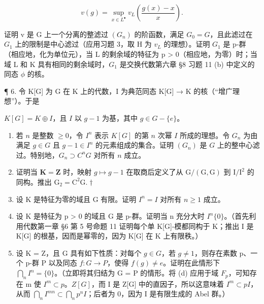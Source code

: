 \[
v (g) = \sup _ {x \in L ^ {\bullet}} v _ {L} \left(\frac {g (x) - x}{x}\right).
\]

证明 v 是 G 上一个分离的整滤过 \((G_{n})\) 的阶函数，满足 \(G_{0} = G\)，且此滤过在 \(G_{1}\) 上的限制是中心滤过（应用习题 3，取 H 为 \(v_{L}\) 的理想）。证明 \(G_{1}\) 是 p-群（相应地，化为单位元），当 L 的剩余域的特征为 p \textgreater{} 0（相应地，为零）时；当域 L 和 K 具有相同的剩余域时，\(G_{1}\) 是交换代数第六章 §8 习题 11 (b) 中定义的同态 \(\phi\) 的核。

¶ 6. 令 K{[}G{]} 为 G 在 K 上的代数，I 为典范同态 K{[}G{]} → K 的核（“增广理想”）。于是


\(K[G] = K \oplus I\)，且 \(I\) 以 \(g - 1\) 为基，其中 \(g \in G - \{e\}\)。

\begin{enumerate}
\def\labelenumi{(\alph{enumi})}
\item
  若 \(n\) 是整数 \(\geqslant 0\)，令 \(I^n\) 表示 \(K[G]\) 的第 \(n\) 次幂 \(I\) 所成的理想。令 \(G_n\) 为由满足 \(g \in G\) 且 \(g - 1 \in I^n\) 的元素组成的集合。证明 \((G_n)\) 是 \(G\) 上的整中心滤过。特别地，\(G_n \supset C^n G\) 对所有 \(n\) 成立。
\item
  证明当 \(\mathbf{K} = \mathbf{Z}\) 时，映射 \(g \mapsto g - 1\) 在取商后定义了从 \(\mathrm{G} / (\mathrm{G}, \mathrm{G})\) 到 \(\mathrm{I} / \mathrm{I}^2\) 的同构。推出 \(\mathrm{G}_2 = \mathrm{C}^2\mathrm{G}.\dagger\)
\item
  设 K 是特征为零的域且 G 有限。证明 \(I^{n} = I\) 对所有 \(n \geqslant 1\) 成立。
\item
  设 K 是特征为 p \textgreater{} 0 的域且 G 是 p-群。证明当 n 充分大时 \(I^{n}\{0\}\)。（首先利用代数第一章 §6 第 5 号命题 11 证明每个单 K{[}G{]}-模都同构于 K；推出 I 是 K{[}G{]} 的根基，因而是幂零的，因为 K{[}G{]} 在 K 上有限秩。）
\item
  设 K = Z，且 G 具有如下性质：对每个 \(g \in G\)，若 \(g \neq 1\)，则存在素数 p、一个 p-群 P 以及同态 \(f: G \to P\)，使得 \(f(g) \neq e\)。证明在此情形下 \(\bigcap_{n} I^{n} = \{0\}\)。（立即将其归结为 G = P 的情形。将 (d) 应用于域 \(F_{p}\)，可知存在 m 使 \(I^{m} \subset p\)。\(Z[G]\)，而 I 是 Z{[}G{]} 中的直因子，所以这意味着 \(I^{m} \subset pI\)，从而 \(\bigcap_{n} I^{mn} \subset \bigcap_{n} p^{n}I\)；后者为 0，因为 I 是有限生成的 Abel 群。）
\end{enumerate}

